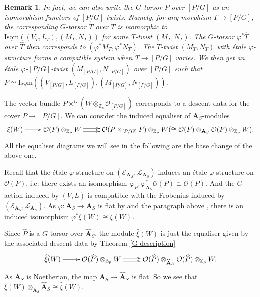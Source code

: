 \documentclass[10pt]{article}
\newtheorem{rmk}[thm]{Remark}
\numberwithin{equation}{section}
\newcommand{\bZ}{{\mathbb Z}}
\newcommand{\calE}{{\mathcal E}}
\newcommand{\calL}{{\mathcal L}}
\newcommand{\calO}{{\mathcal O}}
\newcommand{\Isom}{{\mathrm{Isom}}}         %
\newcommand{\bfA}{{\textbf{A}}}
\begin{document}
\begin{rmk}
   In fact, we can also write the $G$-torsor $P$ over $[P/G]$ as an isomorphism functors of $[P/G]$-twists. Namely, for any morphism $T\to [P/G]$, the corresponding  $G$-torsor $\widetilde T$ over $T$ is isomorphic to $\underline{\Isom}((V_T,L_T),(M_T,N_T))$ for some $T$-twist $(M_T,N_T)$. The $G$-torsor $\varphi^*\widehat T$ over $\widehat T$ then corresponds to $(\varphi^*M_T,\varphi^*N_T)$. The $T$-twist $(M_T,N_T)$ with \'etale $\varphi$-structure forms a compatible system when $T\to [P/G]$ varies. We then get an \'etale $\varphi$-$[P/G]$-twist $(M_{[P/G]},N_{[P/G]})$ over $[P/G]$ such that $P\simeq \underline{\Isom}((V_{[P/G]},L_{[P/G]}),(M_{[P/G]},N_{[P/G]}))$.
\end{rmk}

The vector bundle $P\times^G(W\otimes_{\bZ_p}\calO_{[P/G]})$ corresponds to a descent data for the cover $P\to [P/G]$. We can consider the induced equaliser of $\bfA_S$-modules
\begin{equation}\label{Diagram-xiW}
    \xymatrix{
    \xi(W)\ar[r]& \calO(P)\otimes_{\bZ_p}W\ar@<.5ex>[r]\ar@<-.5ex>[r]&\calO(P\times_{[P/G]}P)\otimes_{\bZ_p}W (\cong \calO(P)\otimes_{\bfA_S}\calO(P)\otimes_{\bZ_p} W).
    }
\end{equation}
All the equaliser diagrams we will see in the following are the base change of the above one.

 Recall that the \'etale $\varphi$-structure on $(\calE_{\bfA_S},\calL_{\bfA_S})$ induces an \'etale $\varphi$-structure on $\calO(P)$, i.e. there exists an isomorphism $\varphi_P:\varphi^*_{\bfA_S}\calO(P)\cong \calO(P)$. And the $G$-action induced by $(V,L)$ is compatible with the Frobenius induced by $(\calE_{\bfA_S},\calL_{\bfA_S})$. As $\varphi:\bfA_S\to \bfA_S$ is flat by \cite[Lemma 5.2.5]{EG21} and the paragraph above \cite[Lemma 2.2.16]{EG22}, there is an induced isomorphism $\varphi^*\xi(W)\cong \xi(W)$.

Since $\widehat P$ is a $G$-torsor over $\widehat \bfA_S$, the module $\widehat \xi(W)$ is just the equaliser given by the associated descent data by Theorem \ref{G-description}
\begin{equation}
    \xymatrix{
    \widehat\xi(W)\ar[r]& \calO(\widehat P)\otimes_{\bZ_p}W\ar@<.5ex>[r]\ar@<-.5ex>[r] &\calO(\widehat P)\otimes_{\widehat \bfA_S}\calO(\widehat P)\otimes_{\bZ_p} W.
    }
\end{equation}
As $\bfA_S$ is Noetherian, the map $\bfA_S\to \widehat \bfA_S$ is flat. So we see that $\xi(W)\otimes_{\bfA_S}\widehat\bfA_S\cong \widehat \xi(W)$.
\end{document}
